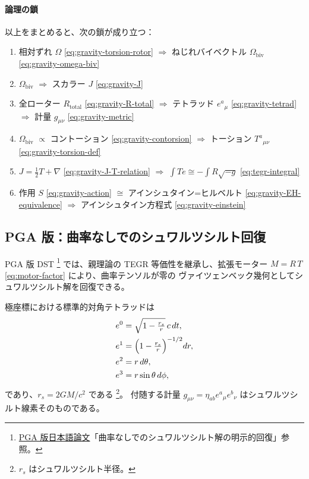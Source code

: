 \documentclass[dvipdfmx,a4paper,oneside]{jsbook}
\numberwithin{equation}{chapter}
\begin{document}
\paragraph{論理の鎖}
以上をまとめると、次の鎖が成り立つ：
\begin{enumerate}[leftmargin=2em]
  \item 相対ずれ \(\Omega\) \eqref{eq:gravity-torsion-rotor} \(\Rightarrow\) ねじれバイベクトル \(\Omega_{\mathrm{biv}}\) \eqref{eq:gravity-omega-biv}
  \item \(\Omega_{\mathrm{biv}}\) \(\Rightarrow\) スカラー \(J\) \eqref{eq:gravity-J}
  \item 全ローター \(R_{\mathrm{total}}\) \eqref{eq:gravity-R-total} \(\Rightarrow\) テトラッド \(e^a{}_\mu\) \eqref{eq:gravity-tetrad} \(\Rightarrow\) 計量 \(g_{\mu\nu}\) \eqref{eq:gravity-metric}
  \item \(\Omega_{\mathrm{biv}}\) \(\propto\) コントーション \eqref{eq:gravity-contorsion} \(\Rightarrow\) トーション \(T^a{}_{\mu\nu}\) \eqref{eq:gravity-torsion-def}
  \item \(J = \tfrac{1}{2}T + \nabla\) \eqref{eq:gravity-J-T-relation} \(\Rightarrow\) \(\int T e \cong -\int R\sqrt{-g}\) \eqref{eq:tegr-integral}
  \item 作用 \(S\) \eqref{eq:gravity-action} \(\cong\) アインシュタイン=ヒルベルト \eqref{eq:gravity-EH-equivalence} \(\Rightarrow\) アインシュタイン方程式 \eqref{eq:gravity-einstein}
\end{enumerate}

\subsection{PGA 版：曲率なしでのシュワルツシルト回復}

PGA 版 DST \footnote{\hyperref[sec:sister-manuscripts]{PGA 版日本語論文}「曲率なしでのシュワルツシルト解の明示的回復」参照。} では、親理論の TEGR 等価性を継承し、拡張モーター \(M = R\,T\) \eqref{eq:motor-factor} により、曲率テンソルが零の ヴァイツェンベック幾何としてシュワルツシルト解を回復できる。

極座標における標準的対角テトラッドは
\begin{align}
  e^{0} &= \sqrt{1 - \tfrac{r_s}{r}}\, c\, dt, \nonumber\\
  e^{1} &= \Bigl(1 - \tfrac{r_s}{r}\Bigr)^{-1/2} dr, \nonumber\\
  e^{2} &= r\, d\theta, \nonumber\\
  e^{3} &= r\sin\theta\, d\phi,
  \label{eq:gravity-sch-tetrad}
\end{align}
であり、\(r_s = 2GM/c^2\) である \footnote{\(r_s\) はシュワルツシルト半径。}。
付随する計量 \(g_{\mu\nu} = \eta_{ab} e^a{}_\mu e^b{}_\nu\) はシュワルツシルト線素そのものである。
\end{document}
